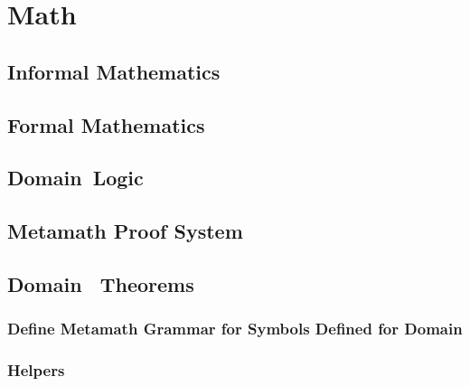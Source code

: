 \documentclass[fleqn,openany]{book}
\newcommand{\logicid}{Domain}
\begin{document}
\part{Math}\label{part:math}

\renewcommand\thechapter{\Alph{chapter}}


\chapter{Informal Mathematics}\label{chapter:simplemath}


\chapter{Formal Mathematics}\label{chapter:math}


\chapter{\logicid~Logic}\label{chapter:KL}


\chapter{Metamath Proof System}\label{chapter:metamath}


\chapter{\logicid~ Theorems}\label{chapter:theorems}
\normalsize

\section{Define Metamath Grammar for Symbols Defined for \logicid}
\allowdisplaybreaks{

}  %

\section{Helpers}
\allowdisplaybreaks{

}  %
\end{document}
